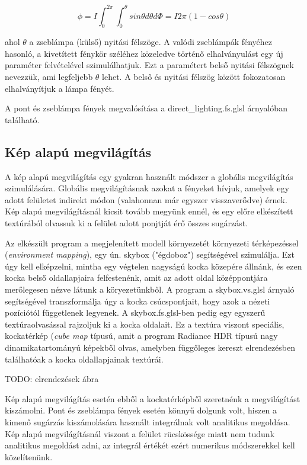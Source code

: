 \[
\phi = I \int_0^{2\pi} { \int_0^\theta { sin\theta d\theta d\Phi } } = I 2\pi (1 - cos\theta)
\]

ahol \(\theta\) a zseblámpa (külső) nyitási félszöge. A valódi zseblámpák fényéhez hasonló, a kivetített fénykör széléhez közeledve történő elhalványulást egy új paraméter felvételével szimulálhatjuk. Ezt a paramétert belső nyitási félszögnek nevezzük, ami legfeljebb \(\theta\) lehet. A belső és nyitási félszög között fokozatosan elhalványítjuk a lámpa fényét.

A pont és zseblámpa fények megvalósítása a direct\_lighting.fs.glsl árnyalóban található.

\subsection{Kép alapú megvilágítás}

A kép alapú megvilágítás egy gyakran használt módszer a globális megvilágítás szimulálására. Globális megvilágításnak azokat a fényeket hívjuk, amelyek egy adott felületet indirekt módon (valahonnan már egyszer visszaverődve) érnek. Kép alapú megvilágításnál kicsit tovább megyünk ennél, és egy előre elkészített textúrából olvassuk ki a felület adott ponjtját érő összes sugárzást.

Az elkészült program a megjelenített modell környezetét környezeti térképezéssel (\textit{environment mapping}), egy ún. skybox ("égdoboz") segítségével szimulálja. Ezt úgy kell elképzelni, mintha egy végtelen nagyságú kocka közepére állnánk, és ezen kocka belső oldallapjaira felfestenénk, amit az adott oldal középpontjára merőlegesen nézve látunk a köryezetünkből. A program a skybox.vs.glsl árnyaló segítségével transzformálja úgy a kocka csúcspontjait, hogy azok a nézeti pozíciótól függetlenek legyenek. A skybox.fs.glsl-ben pedig egy egyszerű textúraolvasással rajzoljuk ki a kocka oldalait. Ez a textúra viszont speciális, kockatérkép (\textit{cube map} típusú, amit a program Radiance HDR típusú nagy dinamikatartományú képekből olvas, amelyben függőleges kereszt elrendezésben találhatóak a kocka oldallapjainak textúrái.

TODO: elrendezések ábra

Kép alapú megvilágítás esetén ebből a kockatérképből szeretnénk a megvilágítást kiszámolni. Pont és zseblámpa fények esetén könnyű dolgunk volt, hiszen a kimenő sugárzás kiszámolására használt integrálnak volt analitikus megoldása. Kép alapú megvilágításnál viszont a felület rücskössége miatt nem tudunk analitikus megoldást adni, az integrál értékét ezért numerikus módszerekkel kell közelítenünk.

